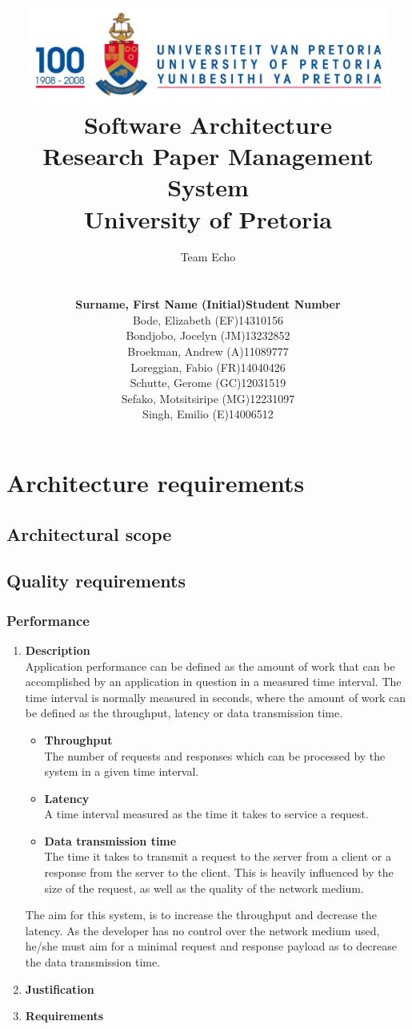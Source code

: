 \documentclass[a4paper,10pt]{article}
\title{\includegraphics[width=12cm]{Eeufeeslogo.jpg} \\
       Software Architecture \\
       Research Paper Management System \\
       \vspace{0.5cm}
       University of Pretoria \\
       \vspace{1.0cm}
       }
\date{}
\author{Team Echo\\
	\vspace{0.5cm} \\
	\begin{tabu} to \textwidth { X[l] X[l]}
		\hline
		\textbf{Surname, First Name (Initial)}	& \textbf{Student Number}	\\ \hline \hline
		Bode, Elizabeth (EF)			& 14310156		\\ \hline
		Bondjobo, Jocelyn (JM)		& 13232852		\\ \hline
		Broekman, Andrew (A)		& 11089777		\\ \hline
		Loreggian, Fabio (FR)			& 14040426		\\ \hline
		Schutte, Gerome (GC)		& 12031519		\\ \hline
		Sefako, Motsitsiripe (MG)		& 12231097		\\ \hline
		Singh, Emilio (E)			& 14006512		\\ \hline
		\hline
	\end{tabu}}
\begin{document}
\maketitle
\thispagestyle{empty}
\clearpage

\newpage
{}
\thispagestyle{empty}
\tableofcontents
\clearpage

\newpage
{}

\section{Architecture requirements}
\subsection{Architectural scope}
\subsection{Quality requirements}
	\subsubsection{Performance}
		\begin{enumerate}
			\item \textbf{Description} \\
				Application performance can be defined as the amount of work that can be accomplished by an application in question in a measured time interval. The time interval is normally measured in seconds, where the amount of work can be defined as the throughput, latency or data transmission time.
				\begin{itemize}
					\item \textbf{Throughput} \\
					The number of requests and responses which can be processed by the system in a given time interval.
					\item \textbf{Latency} \\
					A time interval measured as the time it takes to service a request.
					\item \textbf{Data transmission time} \\
					The time it takes to transmit a request to the server from a client or a response from the server to the client. This is heavily influenced by the size of the request, as well as the quality of the network medium.
				\end{itemize}

				The aim for this system, is to increase the throughput and decrease the latency. As the developer has no control over the network medium used, he/she must aim for a minimal request and response payload as to decrease the data transmission time.

			\item \textbf{Justification} \\
			\item \textbf{Requirements}\\
		\end{enumerate}
\end{document}
